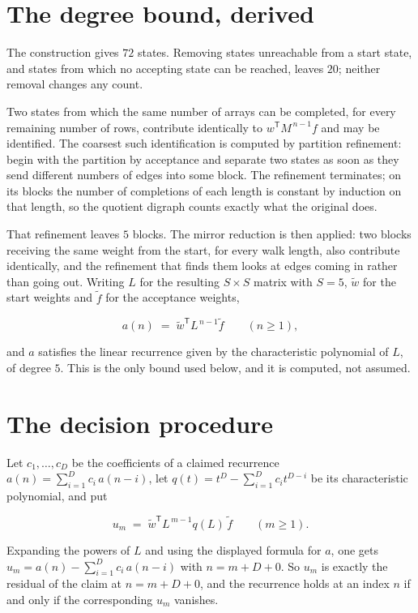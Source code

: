 \documentclass[11pt]{article}
\theoremstyle{definition}
\begin{document}
\section{The degree bound, derived}

The construction gives $72$ states. Removing states unreachable from a start state, and states from which no accepting state can be reached, leaves $20$; neither removal changes any count.

Two states from which the same number of arrays can be completed, for every remaining number of rows, contribute identically to $w^{\mathsf T}M^{\,n-1}f$ and may be identified. The coarsest such identification is computed by partition refinement: begin with the partition by acceptance and separate two states as soon as they send different numbers of edges into some block. The refinement terminates; on its blocks the number of completions of each length is constant by induction on that length, so the quotient digraph counts exactly what the original does.

That refinement leaves $5$ blocks. The mirror reduction is then applied: two blocks receiving the same weight from the start, for every walk length, also contribute identically, and the refinement that finds them looks at edges coming in rather than going out. Writing $L$ for the resulting $S \times S$ matrix with $S = 5$, $\tilde w$ for the start weights and $\tilde f$ for the acceptance weights,

\[a(n) \;=\; \tilde w^{\mathsf T} L^{\,n-1} \tilde f \qquad (n \ge 1),\]

and $a$ satisfies the linear recurrence given by the characteristic polynomial of $L$, of degree $5$. This is the only bound used below, and it is computed, not assumed.

\section{The decision procedure}

Let $c_1,\dots,c_D$ be the coefficients of a claimed recurrence $a(n) = \sum_{i=1}^{D} c_i\,a(n-i)$, let $q(t) = t^{D} - \sum_{i=1}^{D} c_i t^{D-i}$ be its characteristic polynomial, and put

\[u_m \;=\; \tilde w^{\mathsf T} L^{\,m-1} q(L)\,\tilde f \qquad (m \ge 1).\]

Expanding the powers of $L$ and using the displayed formula for $a$, one gets $u_m = a(n) - \sum_{i=1}^{D} c_i\,a(n-i)$ with $n = m + D + 0$. So $u_m$ is exactly the residual of the claim at $n = m + D + 0$, and the recurrence holds at an index $n$ if and only if the corresponding $u_m$ vanishes.
\end{document}
